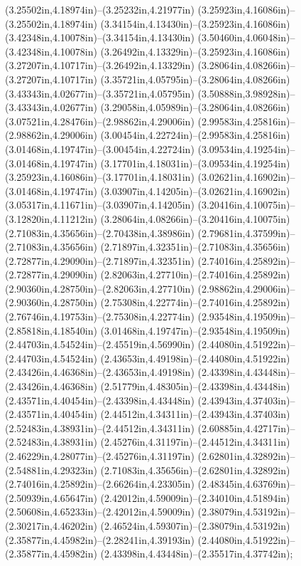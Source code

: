(3.25502in,4.18974in)--(3.25232in,4.21977in) (3.25923in,4.16086in)--(3.25502in,4.18974in) (3.34154in,4.13430in)--(3.25923in,4.16086in) (3.42348in,4.10078in)--(3.34154in,4.13430in) (3.50460in,4.06048in)--(3.42348in,4.10078in) (3.26492in,4.13329in)--(3.25923in,4.16086in) (3.27207in,4.10717in)--(3.26492in,4.13329in) (3.28064in,4.08266in)--(3.27207in,4.10717in) (3.35721in,4.05795in)--(3.28064in,4.08266in) (3.43343in,4.02677in)--(3.35721in,4.05795in) (3.50888in,3.98928in)--(3.43343in,4.02677in) (3.29058in,4.05989in)--(3.28064in,4.08266in) (3.07521in,4.28476in)--(2.98862in,4.29006in) (2.99583in,4.25816in)--(2.98862in,4.29006in) (3.00454in,4.22724in)--(2.99583in,4.25816in) (3.01468in,4.19747in)--(3.00454in,4.22724in) (3.09534in,4.19254in)--(3.01468in,4.19747in) (3.17701in,4.18031in)--(3.09534in,4.19254in) (3.25923in,4.16086in)--(3.17701in,4.18031in) (3.02621in,4.16902in)--(3.01468in,4.19747in) (3.03907in,4.14205in)--(3.02621in,4.16902in) (3.05317in,4.11671in)--(3.03907in,4.14205in) (3.20416in,4.10075in)--(3.12820in,4.11212in) (3.28064in,4.08266in)--(3.20416in,4.10075in) (2.71083in,4.35656in)--(2.70438in,4.38986in) (2.79681in,4.37599in)--(2.71083in,4.35656in) (2.71897in,4.32351in)--(2.71083in,4.35656in) (2.72877in,4.29090in)--(2.71897in,4.32351in) (2.74016in,4.25892in)--(2.72877in,4.29090in) (2.82063in,4.27710in)--(2.74016in,4.25892in) (2.90360in,4.28750in)--(2.82063in,4.27710in) (2.98862in,4.29006in)--(2.90360in,4.28750in) (2.75308in,4.22774in)--(2.74016in,4.25892in) (2.76746in,4.19753in)--(2.75308in,4.22774in) (2.93548in,4.19509in)--(2.85818in,4.18540in) (3.01468in,4.19747in)--(2.93548in,4.19509in) (2.44703in,4.54524in)--(2.45519in,4.56990in) (2.44080in,4.51922in)--(2.44703in,4.54524in) (2.43653in,4.49198in)--(2.44080in,4.51922in) (2.43426in,4.46368in)--(2.43653in,4.49198in) (2.43398in,4.43448in)--(2.43426in,4.46368in) (2.51779in,4.48305in)--(2.43398in,4.43448in) (2.43571in,4.40454in)--(2.43398in,4.43448in) (2.43943in,4.37403in)--(2.43571in,4.40454in) (2.44512in,4.34311in)--(2.43943in,4.37403in) (2.52483in,4.38931in)--(2.44512in,4.34311in) (2.60885in,4.42717in)--(2.52483in,4.38931in) (2.45276in,4.31197in)--(2.44512in,4.34311in) (2.46229in,4.28077in)--(2.45276in,4.31197in) (2.62801in,4.32892in)--(2.54881in,4.29323in) (2.71083in,4.35656in)--(2.62801in,4.32892in) (2.74016in,4.25892in)--(2.66264in,4.23305in) (2.48345in,4.63769in)--(2.50939in,4.65647in) (2.42012in,4.59009in)--(2.34010in,4.51894in) (2.50608in,4.65233in)--(2.42012in,4.59009in) (2.38079in,4.53192in)--(2.30217in,4.46202in) (2.46524in,4.59307in)--(2.38079in,4.53192in) (2.35877in,4.45982in)--(2.28241in,4.39193in) (2.44080in,4.51922in)--(2.35877in,4.45982in) (2.43398in,4.43448in)--(2.35517in,4.37742in);
